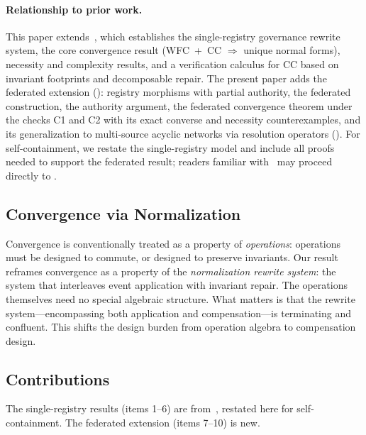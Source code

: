 \documentclass[11pt,a4paper]{article}
\theoremstyle{plain}
\theoremstyle{definition}
\theoremstyle{remark}
\renewcommand{\_}{\textunderscore\allowbreak}
\begin{document}
\paragraph{Relationship to prior work.}
This paper extends~\cite{blackwell2026nc}, which establishes the
single-registry governance rewrite system, the core convergence result
(WFC~+~CC $\Rightarrow$ unique normal forms), necessity and complexity results,
and a verification calculus for CC based on invariant footprints and
decomposable repair.  The present paper adds the federated extension
(): registry morphisms with partial authority, the
federated construction, the authority argument, the federated convergence
theorem under the checks C1 and C2 with its exact converse and necessity
counterexamples, and its generalization to multi-source acyclic networks via
resolution operators ().  For
self-containment, we restate the
single-registry model and include all proofs needed to support the federated
result; readers familiar with~\cite{blackwell2026nc} may proceed directly to
.

\subsection{Convergence via Normalization}

Convergence is conventionally treated as a property of \emph{operations}:
operations must be designed to commute, or designed to preserve invariants.
Our result reframes convergence as a property of the \emph{normalization
rewrite system}: the system that interleaves event application with invariant
repair.  The operations themselves need no special algebraic structure.  What
matters is that the rewrite system---encompassing both application and
compensation---is terminating and confluent.  This shifts the design burden
from operation algebra to compensation design.

\subsection{Contributions}

The single-registry results (items 1--6) are from~\cite{blackwell2026nc},
restated here for self-containment.  The federated extension (items 7--10) is new.
\end{document}

